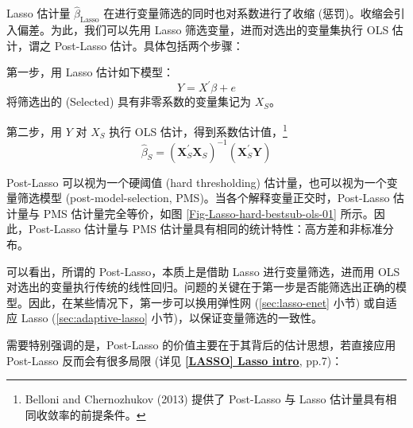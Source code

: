 Lasso 估计量 $\widehat{\beta}_{\text{Lasso}}$ 在进行变量筛选的同时也对系数进行了收缩 (惩罚)。收缩会引入偏差。为此，我们可以先用 Lasso 筛选变量，进而对选出的变量集执行 OLS 估计，谓之 Post-Lasso 估计。具体包括两个步骤：


第一步，用 Lasso 估计如下模型：
$$Y=X^{\prime} \beta+e$$
将筛选出的 (Selected) 具有非零系数的变量集记为 $X_{S}$。

第二步，用 $Y$ 对 $X_{S}$ 执行 OLS 估计，得到系数估计值，\footnote{%
   Belloni and Chernozhukov (2013) 提供了 Post-Lasso 与 Lasso 估计量具有相同收敛率的前提条件。}
$$\widehat{\beta}_{S}=\left(\boldsymbol{X}_{S}^{\prime} \boldsymbol{ X}_{S}\right)^{-1}\left(\boldsymbol{X}_{S}^{\prime} \boldsymbol{Y}\right)$$

Post-Lasso 可以视为一个硬阈值 (hard thresholding) 估计量，也可以视为一个变量筛选模型 (post-model-selection, PMS)。当各个解释变量正交时，Post-Lasso 估计量与 PMS 估计量完全等价，如图 \ref{Fig-Lasso-hard-bestsub-ols-01} 所示。因此，Post-Lasso 估计量与 PMS 估计量具有相同的统计特性：高方差和非标准分布。

可以看出，所谓的 Post-Lasso，本质上是借助 Lasso 进行变量筛选，进而用 OLS 对选出的变量执行传统的线性回归。问题的关键在于第一步是否能筛选出正确的模型。因此，在某些情况下，第一步可以换用弹性网 (\ref{sec:lasso-enet} 小节) 或自适应 Lasso (\ref{sec:adaptive-lasso} 小节)，以保证变量筛选的一致性。

需要特别强调的是，Post-Lasso 的价值主要在于其背后的估计思想，若直接应用 Post-Lasso 反而会有很多局限 (详见 \href{https://www.stata.com/manuals/lassoLasso intro.pdf}{\bfseries{[\MakeUppercase{lasso}] Lasso intro}}, pp.7)：

